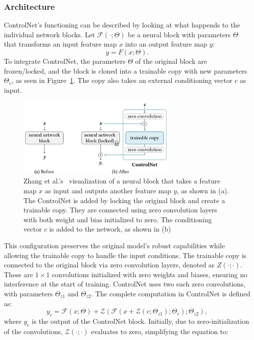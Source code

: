 \subsubsection{Architecture}
ControlNet's functioning can be described by looking at what happends to the individual network blocks. Let $\mathcal{F}(\cdot; \Theta)$ be a neural block with parameters $\Theta$ that transforms an input feature map $x$ into an output feature map $y$:
\[
y = F(x; \Theta).
\]
To integrate ControlNet, the parameters $\Theta$ of the original block are frozen/locked, and the block is cloned into a trainable copy with new parameters $\Theta_c$, as seen in Figure~\ref{fig:control_net:network_blocks}. The copy also takes an external conditioning vector $c$ as input.
\begin{figure}[h!]
    \centering
    \includegraphics[width=0.7\textwidth]{assets/control_net_network_blocks.pdf}
    \caption{Zhang et al.'s~\cite{zhang2023addingconditionalcontroltexttoimage} visualization of a neural block that takes a feature map $x$ as input and outputs another feature map $y$, as shown in (a). The ControlNet is added by locking the original block and create a trainable copy. They are connected using zero convolution layers with both weight and bias initialized to zero. The conditioning vector $c$ is added to the network, as shown in (b)}
    \label{fig:control_net:network_blocks}
\end{figure}
This configuration preserves the original model's robust capabilities while allowing the trainable copy to handle the input conditions. The trainable copy is connected to the original block via zero convolution layers, denoted as $Z(\cdot; \cdot)$. These are $1 \times 1$ convolutions initialized with zero weights and biases, ensuring no interference at the start of training. ControlNet uses two such zero convolutions, with parameters $\Theta_{z1}$ and $\Theta_{z2}$. The complete computation in ControlNet is defined as:
\[
y_c = \mathcal{F}(x; \Theta) + \mathcal{Z}(\mathcal{F}(x + \mathcal{Z}(c; \Theta_{z1}); \Theta_c); \Theta_{z2}),
\]
where $y_c$ is the output of the ControlNet block. Initially, due to zero-initialization of the convolutions, $\mathcal{Z}(\cdot; \cdot)$ evaluates to zero, simplifying the equation to:
